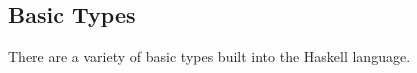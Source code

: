 \subsection{Basic Types}\label{subsec:Basic_Types}
There are a variety of basic types built into the Haskell language.

\subsubsection{\texorpdfstring{}{\texttt{Bool}}}\label{subsubsec:Bool_Type}

\subsubsection{\texorpdfstring{}{\texttt{Char}}}\label{subsubsec:Char_Type}

\subsubsection{\texorpdfstring{}{\texttt{String}}}\label{subsubsec:String_Type}

\subsubsection{\texorpdfstring{}{\texttt{Int}}}\label{subsubsec:Int_Type}

\subsubsection{\texorpdfstring{}{\texttt{Integer}}}\label{subsubsec:Integer_Type}

\subsubsection{\texorpdfstring{}{\texttt{Float}}}\label{subsubsec:Float_Type}

